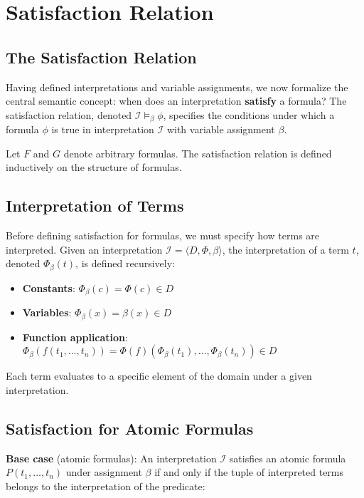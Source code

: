 \documentclass[11pt,a4paper]{article}
\theoremstyle{definition}
\theoremstyle{plain}
\theoremstyle{remark}
\begin{document}
\section{Satisfaction Relation}

\subsection{The Satisfaction Relation}

Having defined interpretations and variable assignments, we now formalize the central semantic concept: when does an interpretation \textbf{satisfy} a formula? The satisfaction relation, denoted $\mathcal{I} \models_\beta \phi$, specifies the conditions under which a formula $\phi$ is true in interpretation $\mathcal{I}$ with variable assignment $\beta$.

Let $F$ and $G$ denote arbitrary formulas. The satisfaction relation is defined inductively on the structure of formulas.

\subsection{Interpretation of Terms}

Before defining satisfaction for formulas, we must specify how terms are interpreted. Given an interpretation $\mathcal{I} = \langle D, \Phi, \beta \rangle$, the interpretation of a term $t$, denoted $\Phi_\beta(t)$, is defined recursively:

\begin{itemize}
    \item \textbf{Constants}: $\Phi_\beta(c) = \Phi(c) \in D$
    \item \textbf{Variables}: $\Phi_\beta(x) = \beta(x) \in D$
    \item \textbf{Function application}: $\Phi_\beta(f(t_1, \dots, t_n)) = \Phi(f)(\Phi_\beta(t_1), \dots, \Phi_\beta(t_n)) \in D$
\end{itemize}

Each term evaluates to a specific element of the domain under a given interpretation.

\subsection{Satisfaction for Atomic Formulas}

\textbf{Base case} (atomic formulas): An interpretation $\mathcal{I}$ satisfies an atomic formula $P(t_1, \dots, t_n)$ under assignment $\beta$ if and only if the tuple of interpreted terms belongs to the interpretation of the predicate:
\end{document}
